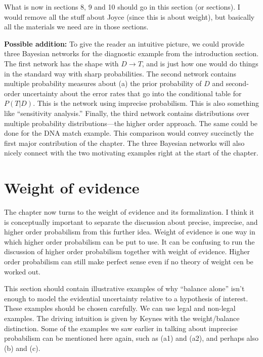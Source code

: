 \documentclass[
  10pt,
  dvipsnames,enabledeprecatedfontcommands]{scrartcl}
\begin{document}
What is now in sections 8, 9 and 10 should go in this section (or
sections). I would remove all the stuff about Joyce (since this is about
weight), but basically all the materials we need are in those sections.

\textbf{Possible addition:} To give the reader an intuitive picture, we
could provide three Bayesian networks for the diagnostic example from
the introduction section. The first network has the shape with
\(D \rightarrow T\), and is just how one would do things in the standard
way with sharp probabilities. The second network contains multiple
probability measures about (a) the prior probability of \(D\) and
second-order uncertainty about the error rates that go into the
conditional table for \(P(T | D)\). This is the network using imprecise
probabilism. This is also something like ``sensitivity analysis.''
Finally, the third network contains distributions over multiple
probability distributions---the higher order approach. The same could be
done for the DNA match example. This comparison would convey succinctly
the first major contribution of the chapter. The three Bayesian networks
will also nicely connect with the two motivating examples right at the
start of the chapter.

\hypertarget{weight-of-evidence}{%
\section{Weight of evidence}\label{weight-of-evidence}}

The chapter now turns to the weight of evidence and its formalization. I
think it is conceptually important to separate the discussion about
precise, imprecise, and higher order probabilism from this further idea.
Weight of evidence is one way in which higher order probabilism can be
put to use. It can be confusing to run the discussion of higher order
probabilism together with weight of evidence. Higher order probabilism
can still make perfect sense even if no theory of weight cen be worked
out.

This section should contain illustrative examples of why ``balance
alone'' isn't enough to model the evidential uncertainty relative to a
hypothesis of interest. These examples should be chosen carefully. We
can use legal and non-legal examples. The driving intuition is given by
Keynes with the weight/balance distinction. Some of the examples we saw
earlier in talking about imprecise probabilism can be mentioned here
again, such as (a1) and (a2), and perhaps also (b) and (c).
\end{document}
